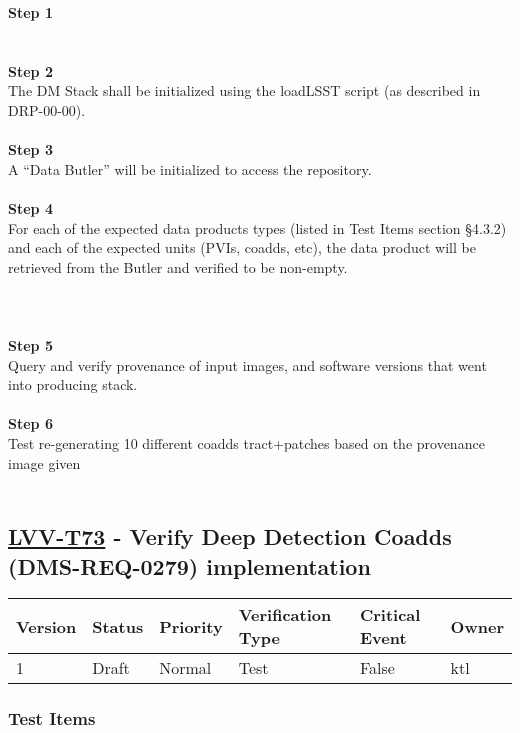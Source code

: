 \textbf{Step 1}\\
~\\
~\\
\textbf{Step 2}\\
The DM Stack shall be initialized using the loadLSST script (as
described in DRP-00-00).\\
~\\
\textbf{Step 3}\\
A ``Data Butler'' will be initialized to access the repository.\\
~\\
\textbf{Step 4}\\
For each of the expected data products types (listed in Test Items
section §4.3.2) and each of the expected units (PVIs, coadds, etc), the
data product will be retrieved from the Butler and verified to be
non-empty.\\
~\\
~\\
~\\
\textbf{Step 5}\\
Query and verify provenance of input images, and software versions that
went into producing stack.\\
~\\
\textbf{Step 6}\\
Test re-generating 10 different coadds tract+patches based on the
provenance image given\\
~\\

\hypertarget{lvv-t73---verify-deep-detection-coadds-dms-req-0279-implementation}{%
\subsection{\texorpdfstring{\href{https://jira.lsstcorp.org/secure/Tests.jspa\#/testCase/LVV-T73}{LVV-T73}
- Verify Deep Detection Coadds (DMS-REQ-0279)
implementation}{LVV-T73 - Verify Deep Detection Coadds (DMS-REQ-0279) implementation}}\label{lvv-t73---verify-deep-detection-coadds-dms-req-0279-implementation}}

\begin{longtable}[]{@{}llllll@{}}
\toprule
Version & Status & Priority & Verification Type & Critical Event &
Owner\tabularnewline
\midrule
\endhead
1 & Draft & Normal & Test & False & ktl\tabularnewline
\bottomrule
\end{longtable}

\hypertarget{test-items-4}{%
\subsubsection{Test Items}\label{test-items-4}}

